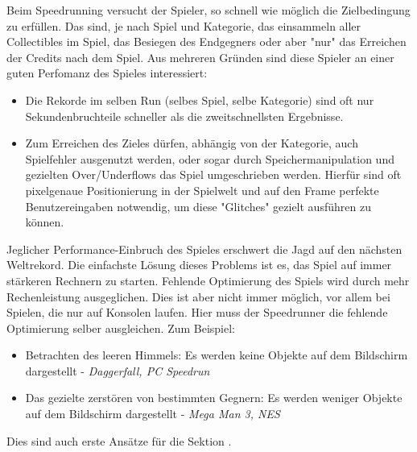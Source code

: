 Beim Speedrunning versucht der Spieler, so schnell wie möglich die Zielbedingung zu erfüllen. Das sind, je nach Spiel und Kategorie, das einsammeln aller Collectibles im Spiel, das Besiegen des \mbox{Endgegners} oder aber "nur" das Erreichen der Credits nach dem Spiel. Aus mehreren Gründen sind diese Spieler an einer guten Perfomanz des Spieles interessiert:

\begin{itemize}
\item Die Rekorde im selben Run (selbes Spiel, selbe Kategorie) sind oft nur Sekundenbruchteile schneller als die zweitschnellsten Ergebnisse.
\item Zum Erreichen des Zieles dürfen, abhängig von der Kategorie, auch Spielfehler ausgenutzt werden, oder sogar durch Speichermanipulation und gezielten Over/Underflows das Spiel umgeschrieben werden. Hierfür sind oft pixelgenaue Positionierung in der Spielwelt und auf den Frame perfekte Benutzereingaben notwendig, um diese "Glitches" gezielt ausführen zu können.
\end{itemize}

Jeglicher Performance-Einbruch des Spieles erschwert die Jagd auf den nächsten Weltrekord. Die einfachste Lösung dieses Problems ist es, das Spiel auf immer stärkeren Rechnern zu starten. Fehlende Optimierung des Spiels wird durch mehr Rechenleistung ausgeglichen.
Dies ist aber nicht immer möglich, vor allem bei Spielen, die nur auf Konsolen laufen. Hier muss der Speedrunner die fehlende Optimierung selber ausgleichen. Zum Beispiel:
\begin{itemize}
\item Betrachten des leeren Himmels: Es werden keine Objekte auf dem Bildschirm dargestellt - \emph{Daggerfall, PC Speedrun}
\item Das gezielte zerstören von bestimmten Gegnern: Es werden weniger Objekte auf dem Bildschirm dargestellt - \emph{Mega Man 3, NES }
\end{itemize}
Dies sind auch erste Ansätze für die Sektion .

